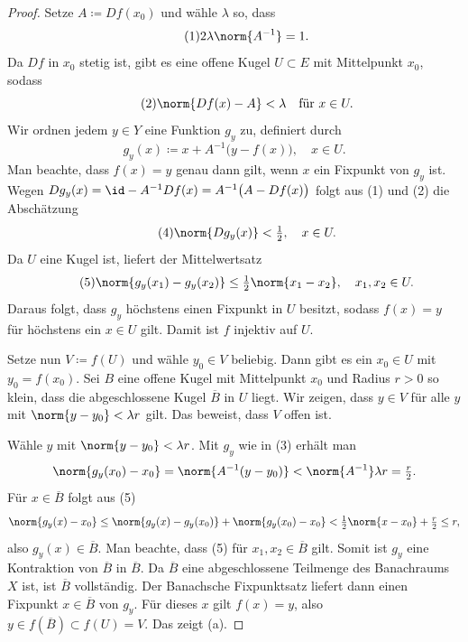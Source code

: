 \documentclass[11pt]{article}
\begin{document}
\begin{proof}
  Setze $A \coloneqq Df(x_0)$ und wähle $\lambda$ so, dass
  \begin{equation*}\tag{1}
    2 \lambda \norm{A^{-1}} = 1.
  \end{equation*}
  Da $Df$ in $x_0$ stetig ist, gibt es eine offene Kugel $U \subset E$ mit Mittelpunkt $x_0$, sodass
  \begin{equation*}\tag{2}
    \norm{Df(x) - A} < \lambda \quad \text{für } x \in U.
  \end{equation*}
  Wir ordnen jedem $y \in Y$ eine Funktion $g_y$ zu, definiert durch
  \begin{equation*}\tag{3}
    g_y(x) \coloneqq x + A^{-1}\bigl(y - f(x)\bigr), \quad x \in U.
  \end{equation*}
Man beachte, dass $f(x) = y$ genau dann gilt, wenn $x$ ein Fixpunkt von $g_y$ ist.
  Wegen $Dg_y(x) = \id - A^{-1} Df(x) = A^{-1}\bigl(A - Df(x)\bigr)$ folgt aus (1) und (2) die Abschätzung
  \begin{equation*}\tag{4}
    \norm{Dg_y(x)} < \tfrac{1}{2}, \quad x \in U.
  \end{equation*}
  Da $U$ eine Kugel ist, liefert der Mittelwertsatz
  \begin{equation*}\tag{5}
    \norm{g_y(x_1) - g_y(x_2)} \le \tfrac{1}{2} \norm{x_1 - x_2}, \quad x_1, x_2 \in U.
  \end{equation*}
Daraus folgt, dass $g_y$ höchstens einen Fixpunkt in $U$ besitzt, sodass $f(x) = y$ für höchstens ein $x \in U$ gilt. Damit ist $f$ injektiv auf $U$.

  Setze nun $V \coloneqq f(U)$ und wähle $y_0 \in V$ beliebig. Dann gibt es ein $x_0 \in U$ mit $y_0 = f(x_0)$. Sei $B$ eine offene Kugel mit Mittelpunkt $x_0$ und Radius $r > 0$ so klein, dass die abgeschlossene Kugel $\overline{B}$ in $U$ liegt. Wir zeigen, dass $y \in V$ für alle $y$ mit $\norm{y - y_0} < \lambda r$ gilt. Das beweist, dass $V$ offen ist.


  Wähle $y$ mit $\norm{y - y_0} < \lambda r$. Mit $g_y$ wie in (3) erhält man
  \[ \norm{g_y(x_0) - x_0} = \norm{A^{-1}(y - y_0)} < \norm{A^{-1}} \lambda r = \tfrac{r}{2}. \]
Für $x \in \overline{B}$ folgt aus (5)
  \[ \norm{g_y(x) - x_0} \le \norm{g_y(x) - g_y(x_0)} + \norm{g_y(x_0) - x_0} < \tfrac{1}{2} \norm{x - x_0} + \tfrac{r}{2} \le r, \]
  also $g_y(x) \in \overline{B}$.
Man beachte, dass (5) für $x_1, x_2 \in \overline{B}$ gilt. Somit ist $g_y$ eine Kontraktion von $\overline{B}$ in $\overline{B}$. Da $\overline{B}$ eine abgeschlossene Teilmenge des Banachraums $X$ ist, ist $\overline{B}$ vollständig. Der Banachsche Fixpunktsatz liefert dann einen Fixpunkt $x \in \overline{B}$ von $g_y$. Für dieses $x$ gilt $f(x) = y$, also $y \in f(\overline{B}) \subset f(U) = V$. Das zeigt (a).


\end{proof}
\end{document}
